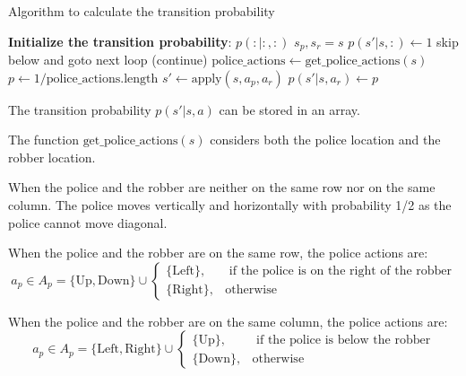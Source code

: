 \documentclass{article}
\begin{document}
\begin{minipage}{0.9\textwidth}
  \begin{algorithm}[H]

    \centering
    \caption{Algorithm to calculate the transition probability}
    \label{algo1}
    \begin{algorithmic}
      \State \textbf{Initialize the transition probability}: $p(: | :, :)$
        \State $s_p, s_r = s$
          \State $p(s' | s, :) \gets 1$
          \State skip below and goto next loop (continue)
        \EndIf
          \State $\text{police\_actions} \gets \text{get\_police\_actions}(s)$
          \State $p \gets 1 / \text{police\_actions.length}$
            \State $s' \gets \text{apply}(s, a_p, a_r)$
            \State $p(s' | s, a_r) \gets p$
          \EndFor
        \EndFor
      \EndFor
    \end{algorithmic}
  \end{algorithm}
\end{minipage}

The transition probability $p(s' | s, a)$ can be stored in an array.

The function $\text{get\_police\_actions}(s)$ considers both the police location
and the robber location.

When the police and the robber are neither on the same row nor on the same column.
The police moves vertically and horizontally with probability 1/2 as the police
cannot move diagonal.

When the police and the robber are on the same row, the police actions are:
\begin{equation*}
  a_p \in A_p = \{ \text{Up}, \text{Down} \} \cup
  \begin{cases}
    \{ \text{Left} \}, & \text{ if the police is on the right of the robber}\\
    \{ \text{Right} \},& \text{otherwise}
  \end{cases}
\end{equation*}

When the police and the robber are on the same column, the police actions are:
\begin{equation*}
  a_p \in A_p =\{ \text{Left}, \text{Right} \} \cup
  \begin{cases}
    \{ \text{Up} \}, & \text{ if the police is below the robber}\\
    \{ \text{Down} \},& \text{otherwise}
  \end{cases}
\end{equation*}
\end{document}
